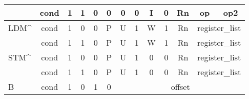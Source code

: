 \documentclass[a4paper,10pt]{report}
\begin{document}
\begin{table}[htb]
\begin{adjustbox}{center}
{\begin{tabular}{l|c|ccc|c|c|c|c|c|c|c|c|c|cccc|ccc|}
					\hline
					& cond                  & 1                  & 1                                       & \multicolumn{1}{c}{0} & \multicolumn{1}{c}{0}                  & \multicolumn{1}{c}{0} & 0                     & I                     & 0                  & \multicolumn{4}{c|}{Rn}                                                   & \multicolumn{4}{c|}{op} & \multicolumn{3}{c|}{op2}                                                            \\ 
					\hline
					LDM\^{}                  & cond                  & 1                  & 0                                       & 0                     & P                                      & U                     & 1                     & W                     & 1                  & \multicolumn{4}{c|}{Rn}                                                   & \multicolumn{7}{c|}{register\_list}                                                                           \\ 
					\hline
					& cond                  & 1                  & 1                                       & 0                     & P                                      & U                     & 1                     & W                     & 1                  & \multicolumn{4}{c|}{Rn}                                                   & \multicolumn{7}{c|}{register\_list}                                                                           \\ 
					\hline
					STM\^{}                  & cond                 & 1                  & 0                                       & 0                     & P                                      & U                     & \multicolumn{1}{c}{1} & \multicolumn{1}{c}{0} & 0                  & \multicolumn{4}{c|}{Rn}                                                   & \multicolumn{7}{c|}{register\_list}                                                                           \\ 
					\hline
					& cond              & 1                  & 1                                       & 0                     & P                                      & U                     & \multicolumn{1}{c}{1} & \multicolumn{1}{c}{0} & 0                  & \multicolumn{4}{c|}{Rn}                                                   & \multicolumn{7}{c|}{register\_list}                                                                           \\ 
					\hline
					B                        & cond                  & 1                  & 0                                       & \multicolumn{1}{c}{1} & 0                                      & \multicolumn{15}{c|}{offset}                                                                                                                                                                                                                                                            \\ 

\end{tabular}}
\end{adjustbox}
\end{table}
\end{document}
